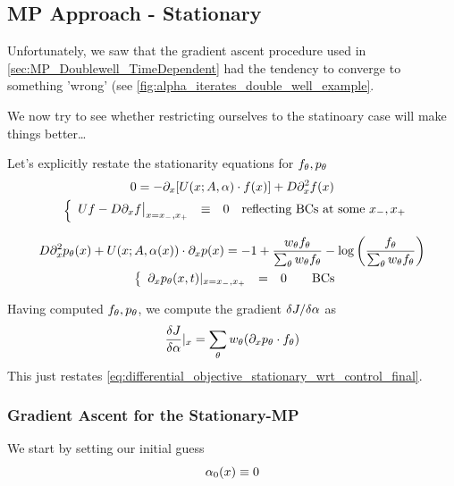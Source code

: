 \documentclass{article}
\begin{document}
\clearpage

\subsection{MP Approach - Stationary}
\label{sec:MP_Doublewell_Statinoary}
Unfortunately, we saw that the gradient ascent procedure used in
\cref{sec:MP_Doublewell_TimeDependent} had the tendency to converge to
something 'wrong' (see \cref{fig:alpha_iterates_double_well_example}. 

We now try to see whether restricting ourselves to the statinoary case will make
things better\ldots

Let's explicitly restate the stationarity equations for ${ f_{\theta}},{ p_{\theta}}$
\begin{equation}
\begin{gathered}
0 = -{\partial}_x [ U(x;A, {\alpha}) \cdot f(x )] + D {\partial}_x^2
f(x )
\\
\begin{array}{ll}
	&
	\left\{ \begin{array}{lcll}
	U f - D {\partial}_x f \big|_{x={ x_{-} },{ x_{+} }} &\equiv& 0 & \textrm{reflecting BCs
	at some } { x_{-} }, { x_{+} } \end{array} \right.
\end{array}
\label{eq:forward_density_double_well_stationary}
\end{gathered}
\end{equation}

\begin{equation}
\begin{gathered}
D {\partial}_x^2 { p_{\theta}}(x ) +
U(x;A, {\alpha}(x ))\cdot {\partial}_x p(x ) =
- 1 + \frac{  w_{\theta} { f_{\theta}} }{\sum_{\theta} { w_{\theta} }{ f_{\theta}}} 
- \log\left(\frac{f_{\theta}} {\sum_{\theta} { w_{\theta} } { f_{\theta}} }\right)
\\
\begin{array}{ll}
	&
	\left\{ \begin{array}{lcll}
	{\partial}_x { p_{\theta}}(x, t)|_{x = { x_{-} }, { x_{+} }}  &=& 0  \quad &\textrm{BCs}
\end{array} \right.
\end{array}
\label{eq:backward_adjoint_double_well_statinoary}
\end{gathered}
\end{equation}

Having computed ${ f_{\theta}}, { p_{\theta}}$, we compute the gradient $\delta J / \delta {\alpha}$
as
$$
\frac {\delta J}{\delta {\alpha}} |_{x} = \sum_{\theta} { w_{\theta} } ({\partial}_x { p_{\theta}} \cdot { f_{\theta}})
$$
This just restates \cref{eq:differential_objective_stationary_wrt_control_final}.

\subsubsection{Gradient Ascent for the Stationary-MP}
We start by setting our initial guess $${\alpha}_0(x) \equiv 0$$ 
\end{document}
